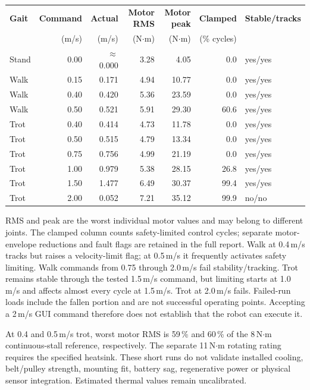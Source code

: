 \documentclass[11pt,a4paper]{article}
\begin{document}
\begin{center}\small
\begin{tabular}{@{}lrrrrrl@{}}
\toprule
\textbf{Gait} & \textbf{Command} & \textbf{Actual} & \textbf{Motor RMS} &
\textbf{Motor peak} & \textbf{Clamped} & \textbf{Stable/tracks} \\
 & (m/s) & (m/s) & (N$\cdot$m) & (N$\cdot$m) & (\% cycles) & \\
\midrule
Stand & 0.00 & $\approx$0.000 & 3.28 & 4.05 & 0.0 & yes/yes \\
Walk & 0.15 & 0.171 & 4.94 & 10.77 & 0.0 & yes/yes \\
Walk & 0.40 & 0.420 & 5.36 & 23.59 & 0.0 & yes/yes \\
Walk & 0.50 & 0.521 & 5.91 & 29.30 & 60.6 & yes/yes \\
Trot & 0.40 & 0.414 & 4.73 & 11.78 & 0.0 & yes/yes \\
Trot & 0.50 & 0.515 & 4.79 & 13.34 & 0.0 & yes/yes \\
Trot & 0.75 & 0.756 & 4.99 & 21.19 & 0.0 & yes/yes \\
Trot & 1.00 & 0.979 & 5.38 & 28.15 & 26.8 & yes/yes \\
Trot & 1.50 & 1.477 & 6.49 & 30.37 & 99.4 & yes/yes \\
Trot & 2.00 & 0.052 & 7.21 & 35.12 & 99.9 & no/no \\
\bottomrule
\end{tabular}
\end{center}

RMS and peak are the worst individual motor values and may belong to different
joints. The clamped column counts safety-limited control cycles; separate
motor-envelope reductions and fault flags are retained in the full report.
Walk at 0.4\,m/s tracks but raises a velocity-limit flag; at 0.5\,m/s it
frequently activates safety limiting. Walk commands from 0.75 through
2.0\,m/s fail stability/tracking. Trot remains stable through the tested
1.5\,m/s command, but limiting starts at 1.0\,m/s and affects almost every
cycle at 1.5\,m/s. Trot at 2.0\,m/s fails. Failed-run loads include the fallen
portion and are not successful operating points. Accepting a 2\,m/s GUI
command therefore does not establish that the robot can execute it.

At 0.4 and 0.5\,m/s trot, worst motor RMS is 59\,\% and 60\,\% of the
8\,N$\cdot$m continuous-stall reference, respectively. The separate
11\,N$\cdot$m rotating rating requires the specified heatsink. These short
runs do not validate installed cooling, belt/pulley strength, mounting fit,
battery sag, regenerative power or physical sensor integration. Estimated
thermal values remain uncalibrated.
\end{document}
